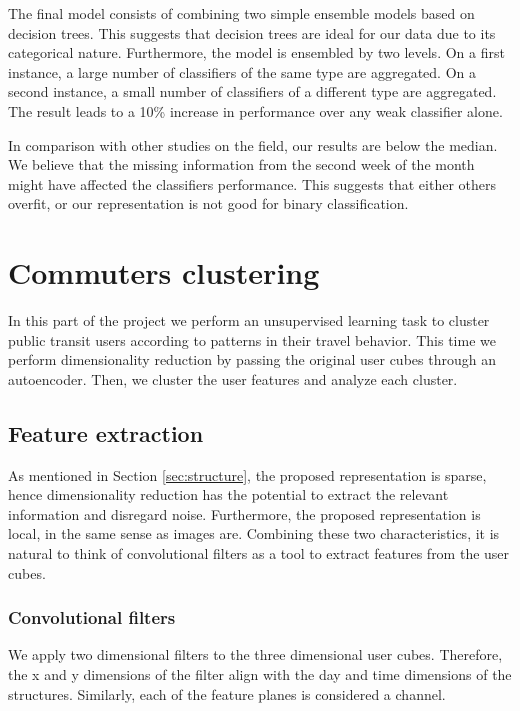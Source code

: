 \documentclass{article}
\begin{document}
The final model consists of combining two simple ensemble models based on decision trees. This suggests that decision trees are ideal for our data due to its categorical nature. Furthermore, the model is ensembled by two levels. On a first instance, a large number of classifiers of the same type are aggregated. On a second instance, a small number of classifiers of a different type are aggregated. The result leads to a 10\% increase in performance over any weak classifier alone.  


In comparison with other studies on the field, our results are below the median. We believe that the missing information from the second week of the month might have affected the classifiers performance. This suggests that either others overfit, or our representation is not good for binary classification. 



\newpage
\section{Commuters clustering}
\label{sec:partIII}
In this part of the project we perform an unsupervised learning task to cluster public transit users according to patterns in their travel behavior. This time we perform dimensionality reduction by passing the original user cubes through an autoencoder. Then, we cluster the user features and analyze each cluster. 

\subsection{Feature extraction}
As mentioned in Section \ref{sec:structure}, the proposed representation is sparse, hence dimensionality reduction has the potential to extract the relevant information and disregard noise. Furthermore, the proposed representation is local, in the same sense as images are. Combining these two characteristics, it is natural to think of convolutional filters as a tool to extract features from the user cubes. 

\subsubsection{Convolutional filters}
We apply two dimensional filters to the three dimensional user cubes. Therefore, the x and y dimensions of the filter align with the day and time dimensions of the structures. Similarly, each of the feature planes is considered a channel. 
\end{document}
